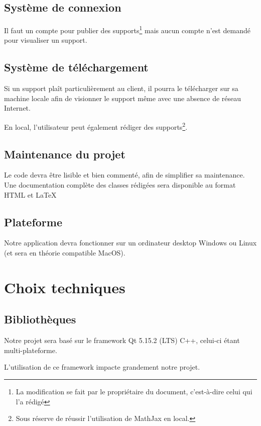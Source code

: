 \section{Système de connexion}

Il faut un compte pour publier des supports\footnote{La modification se fait par le propriétaire du document, c'est-à-dire celui qui l'a rédigé} mais aucun compte n'est demandé pour visualiser un support.

\section{Système de téléchargement}

Si un support plaît particulièrement au client, il pourra le télécharger sur sa machine locale afin de visionner le support même avec une absence de réseau Internet.

En local, l'utilisateur peut également rédiger des supports\footnote{Sous réserve de réussir l'utilisation de MathJax en local.}.

\section{Maintenance du projet}

Le code devra être lisible et bien commenté, afin de simplifier sa maintenance.
Une documentation complète des classes rédigées sera disponible au format HTML et \LaTeX


\section{Plateforme}

Notre application devra fonctionner sur un ordinateur desktop Windows ou Linux (et sera en théorie compatible MacOS).


\chapter{Choix techniques}

\section{Bibliothèques}

Notre projet sera basé sur le framework Qt 5.15.2 (LTS) C++, celui-ci étant multi-plateforme.

L'utilisation de ce framework impacte grandement notre projet.

